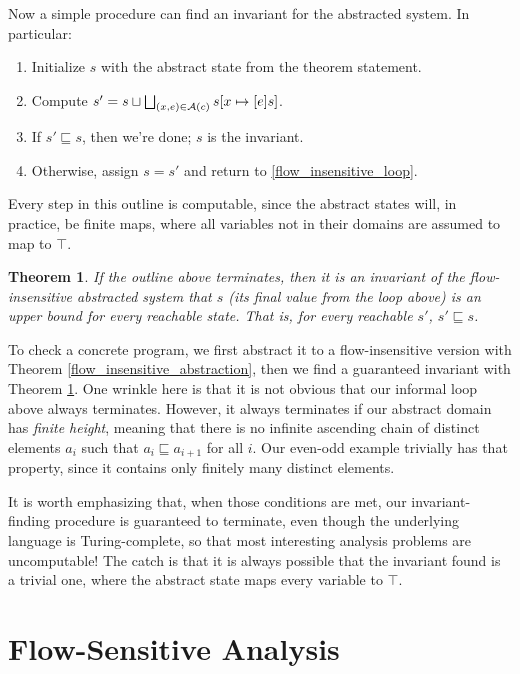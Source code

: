 \documentclass{amsbook}
\newtheorem{theorem}{Theorem}[chapter]
\theoremstyle{definition}
\theoremstyle{remark}
\numberwithin{section}{chapter}
\numberwithin{equation}{chapter}
\begin{document}
Now a simple procedure can find an invariant for the abstracted system.
In particular:

\begin{enumerate}
\item Initialize $s$ with the abstract state from the theorem statement.
\item \label{flow_insensitive_loop}Compute $s' = s \sqcup \bigsqcup_{(x, e) \in \mathcal A(c)} s[x \mapsto [e]s]$.
\item If $s' \sqsubseteq s$, then we're done; $s$ is the invariant.
\item Otherwise, assign $s = s'$ and return to \ref{flow_insensitive_loop}.
\end{enumerate}

Every step in this outline is computable, since the abstract states will, in practice, be finite maps, where all variables not in their domains are assumed to map to $\top$.

\begin{theorem}\label{flow_insensitive_iteration}
  \invariants
  If the outline above terminates, then it is an invariant of the flow-insensitive abstracted system that $s$ (its final value from the loop above) is an upper bound for every reachable state.  That is, for every reachable $s'$, $s' \sqsubseteq s$.
\end{theorem}

To check a concrete program, we first abstract it to a flow-insensitive version with Theorem \ref{flow_insensitive_abstraction}, then we find a guaranteed invariant with Theorem \ref{flow_insensitive_iteration}.
One wrinkle here is that it is not obvious that our informal loop above always terminates.
However, it always terminates if our abstract domain has \emph{finite height}, meaning that there is no infinite ascending chain of distinct elements $a_i$ such that $a_i \sqsubseteq a_{i+1}$ for all $i$.
Our even-odd example trivially has that property, since it contains only finitely many distinct elements.

It is worth emphasizing that, when those conditions are met, our invariant-finding procedure is guaranteed to terminate, even though the underlying language is Turing-complete, so that most interesting analysis problems are uncomputable!
The catch is that it is always possible that the invariant found is a trivial one, where the abstract state maps every variable to $\top$.


\section{Flow-Sensitive Analysis}
\end{document}
